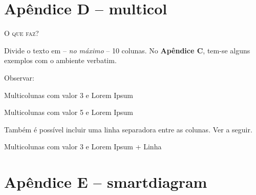 \chapter*{Apêndice D -- multicol}

\noindent\textsc{O que faz?}

Divide o texto em -- \textit{no máximo} -- 10 colunas. No \textbf{Apêndice C}, tem-se alguns exemplos com o ambiente verbatim.

Observar:

\begin{codex}{Multicolunas com valor 3 e Lorem Ipsum}
    \begin{multicols}{3}
        \lipsum[2]
    \end{multicols}
\end{codex}

\begin{multicols}{3}
        \lipsum[2]
    \end{multicols}

\begin{codex}{Multicolunas com valor 5 e Lorem Ipsum}
    \begin{multicols}{5}
        \lipsum[2]
    \end{multicols}
\end{codex}

\begin{multicols}{5}
        \lipsum[2]
   \end{multicols}

Também é possível incluir uma linha separadora entre as colunas. Ver a seguir.

\begin{codex}{Multicolunas com valor 3 e Lorem Ipsum + Linha}
    \begin{multicols}{3}
    \setlength{\columnseprule}{0.2pt}
    \lipsum[2]
    \end{multicols}
\end{codex}

 \begin{multicols}{3}
    \setlength{\columnseprule}{0.2pt}
    \lipsum[2]
 \end{multicols}

\chapter*{Apêndice E -- smartdiagram}

